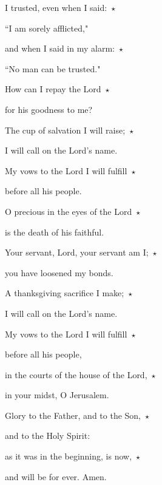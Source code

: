 \noindent I trusted, even when I said:~$\star$~\nopagebreak

``I am sorely afflicted,"

\noindent and when I said in my alarm:~$\star$~\nopagebreak

``No man can be trusted."

\noindent How can I repay the Lord~$\star$~\nopagebreak

for his goodness to me?

\noindent The cup of salvation I will raise;~$\star$~\nopagebreak

I will call on the Lord’s name.

\noindent My vows to the Lord I will fulfill~$\star$~\nopagebreak

before all his people.

\noindent O precious in the eyes of the Lord~$\star$~\nopagebreak

is the death of his faithful.

\noindent Your servant, Lord, your servant am I;~$\star$~\nopagebreak

you have loosened my bonds.

\noindent A thanksgiving sacrifice I make;~$\star$~\nopagebreak

I will call on the Lord’s name.

\noindent My vows to the Lord I will fulfill~$\star$~\nopagebreak

before all his people,

\noindent in the courts of the house of the Lord,~$\star$~\nopagebreak

in your midst, O Jerusalem.

\noindent Glory to the Father, and to the Son,~$\star$~\nopagebreak

and to the Holy Spirit:

\noindent as it was in the beginning, is now,~$\star$~\nopagebreak

and will be for ever. Amen.
